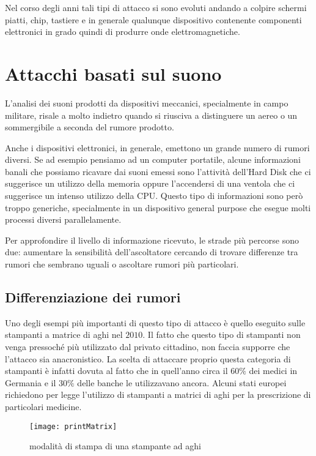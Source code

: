		Nel corso degli anni tali tipi di attacco si sono evoluti andando a colpire schermi piatti\cite{kuhn2006eavesdropping}, chip\cite{martinasek2012simple}, tastiere\cite{vuagnoux2009compromising} e in generale qualunque dispositivo contenente componenti elettronici in grado quindi di produrre onde elettromagnetiche.
			
	\section{Attacchi basati sul suono}
		L'analisi dei suoni prodotti da dispositivi meccanici, specialmente in campo militare, risale a molto indietro quando si riusciva a distinguere un aereo o un sommergibile a seconda del rumore prodotto.
	
		Anche i dispositivi elettronici, in generale, emettono un grande numero di rumori diversi. Se ad esempio pensiamo ad un computer portatile, alcune informazioni banali che possiamo ricavare dai suoni emessi sono l'attività dell'Hard Disk che ci suggerisce un utilizzo della memoria oppure l'accendersi di una ventola che ci suggerisce un intenso utilizzo della CPU. Questo tipo di informazioni sono però troppo generiche, specialmente in un dispositivo general purpose che esegue molti processi diversi parallelamente.
	
		Per approfondire il livello di informazione ricevuto, le strade più percorse sono due: aumentare la sensibilità dell'ascoltatore cercando di trovare differenze tra rumori che sembrano uguali o ascoltare rumori più particolari.
	
		\subsection{Differenziazione dei rumori}	
			Uno degli esempi più importanti di questo tipo di attacco è quello eseguito sulle stampanti a matrice di aghi nel $2010$\cite{backes2010acoustic}. Il fatto che questo tipo di stampanti non venga pressoché più utilizzato dal privato cittadino, non faccia supporre che l'attacco sia anacronistico. La scelta di attaccare proprio questa categoria di stampanti è infatti dovuta al fatto che in quell'anno circa il $60\%$ dei medici in Germania e il $30\%$ delle banche le utilizzavano ancora. Alcuni stati europei richiedono per legge l'utilizzo di stampanti a matrici di aghi per la prescrizione di particolari medicine\cite{bernatzky2011schmerzbehandlung}.
			
			\begin{figure}
				\begin{center}
					\texttt{[image: printMatrix]}
					\caption{modalità di stampa di una stampante ad aghi}
					\label{fig:matrixHead}
				\end{center}
			\end{figure}
			
